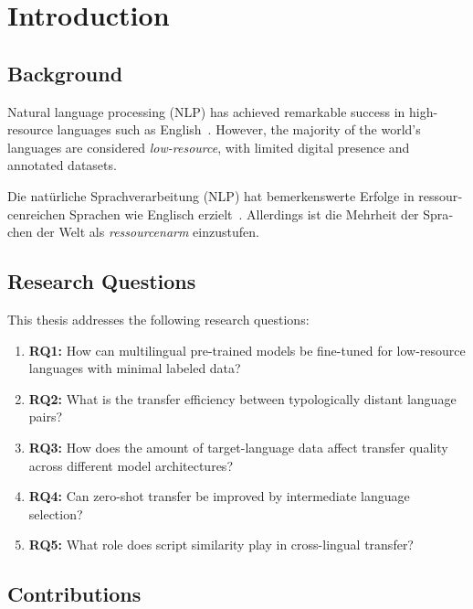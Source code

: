\chapter{Introduction}

\section{Background}
Natural language processing (NLP) has achieved remarkable success in
high-resource languages such as English~\cite{bibid}.  However, the
majority of the world's languages are considered \emph{low-resource},
with limited digital presence and annotated datasets.

\foreignlanguage{german}{Die natürliche Sprachverarbeitung (NLP) hat
bemerkenswerte Erfolge in ressourcenreichen Sprachen wie Englisch
erzielt~\cite{bibid}.  Allerdings ist die Mehrheit der Sprachen der
Welt als \emph{ressourcenarm} einzustufen.}

\section{Research Questions}

This thesis addresses the following research questions:

\begin{enumerate}
    \item \textbf{RQ1:} How can multilingual pre-trained models be
          fine-tuned for low-resource languages with minimal labeled data?

    \item \textbf{RQ2:} What is the transfer efficiency between
          typologically distant language pairs?

    \item \textbf{RQ3:} How does the amount of target-language data
          affect transfer quality across different model architectures?

    \item \textbf{RQ4:} Can zero-shot transfer be improved by
          intermediate language selection?

    \item \textbf{RQ5:} What role does script similarity play in
          cross-lingual transfer?
\end{enumerate}

\section{Contributions}

